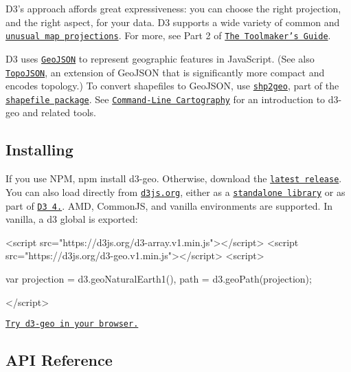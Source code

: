 D3’s approach affords great expressiveness\+: you can choose the right projection, and the right aspect, for your data. D3 supports a wide variety of common and \href{https://github.com/d3/d3-geo-projection}{\tt unusual map projections}. For more, see Part 2 of \href{https://vimeo.com/106198518#t=20m0s}{\tt The Toolmaker’s Guide}.

D3 uses \href{http://geojson.org/geojson-spec.html}{\tt Geo\+J\+S\+ON} to represent geographic features in Java\+Script. (See also \href{https://github.com/mbostock/topojson}{\tt Topo\+J\+S\+ON}, an extension of Geo\+J\+S\+ON that is significantly more compact and encodes topology.) To convert shapefiles to Geo\+J\+S\+ON, use \href{https://github.com/mbostock/shapefile/blob/master/README.md#shp2geo}{\tt shp2geo}, part of the \href{https://github.com/mbostock/shapefile}{\tt shapefile package}. See \href{https://medium.com/@mbostock/command-line-cartography-part-1-897aa8f8ca2c}{\tt Command-\/\+Line Cartography} for an introduction to d3-\/geo and related tools.

\subsection*{Installing}

If you use N\+PM, {\ttfamily npm install d3-\/geo}. Otherwise, download the \href{https://github.com/d3/d3-geo/releases/latest}{\tt latest release}. You can also load directly from \href{https://d3js.org}{\tt d3js.\+org}, either as a \href{https://d3js.org/d3-geo.v1.min.js}{\tt standalone library} or as part of \href{https://github.com/d3/d3}{\tt D3 4.}. A\+MD, Common\+JS, and vanilla environments are supported. In vanilla, a {\ttfamily d3} global is exported\+:


\begin{DoxyCode}
<script src="https://d3js.org/d3-array.v1.min.js"></script>
<script src="https://d3js.org/d3-geo.v1.min.js"></script>
<script>

var projection = d3.geoNaturalEarth1(),
    path = d3.geoPath(projection);

</script>
\end{DoxyCode}


\href{https://tonicdev.com/npm/d3-geo}{\tt Try d3-\/geo in your browser.}

\subsection*{A\+PI Reference}


